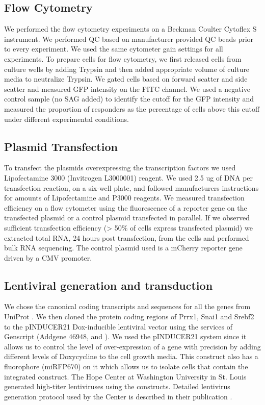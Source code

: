 \subsection{Flow Cytometry}
We performed the flow cytometry experiments on a Beckman Coulter Cytoflex S instrument. We performed QC based on manufacturer provided QC beads prior to every experiment. We used the same cytometer gain settings for all experiments. To prepare cells for flow cytometry, we first released cells from culture wells by adding Trypsin and then added appropriate volume of culture media to neutralize Trypsin. We gated cells based on forward scatter and side scatter and measured GFP intensity on the FITC channel. We used a negative control sample (no SAG added) to identify the cutoff for the GFP intensity and measured the proportion of responders as the percentage of cells above this cutoff under different experimental conditions.

\subsection{Plasmid Transfection}
To transfect the plasmids overexpressing the transcription factors we used Lipofectamine 3000 (Invitrogen L3000001) reagent. We used 2.5 ug of DNA per transfection reaction, on a six-well plate, and followed manufacturers instructions for amounts of Lipofectamine and P3000 reagents. We measured transfection efficiency on a flow cytometer using the fluorescence of a reporter gene on the transfected plasmid or a control plasmid transfected in parallel. If we observed sufficient transfection efficiency (> 50\% of cells express transfected plasmid) we extracted total RNA, 24 hours post transfection, from the cells and performed bulk RNA sequencing. The control plasmid used is a mCherry reporter gene driven by a CMV promoter.

\subsection{Lentiviral generation and transduction}
We chose the canonical coding transcripts and sequences for all the genes from UniProt \cite{noauthor_2021-be}. We then cloned the protein coding regions of Prrx1, Snai1 and Srebf2 to the pINDUCER21 Dox-inducible lentiviral vector \cite{Meerbrey2011-ew} using the services of Genscript (Addgene 46948,   and ). We used the pINDUCER21 system since it allows us to control the level of over-expression of a gene with precision by adding different levels of Doxycycline to the cell growth media. This construct also has a fluorophore (miRFP670) on it which allows us to isolate cells that contain the integrated construct. The Hope Center at Washington University in St. Louis generated high-titer lentiviruses using the constructs. Detailed lentivirus generation protocol used by the Center is described in their publication \cite{Li2012-if}.

